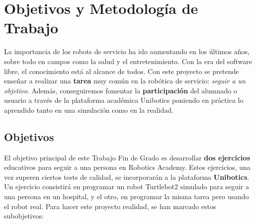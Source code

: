 \chapter{Objetivos y Metodología de Trabajo}
\label{cap:capitulo2}

La importancia de los robots de servicio ha ido aumentando en los últimos años, sobre todo en campos como la salud y el entretenimiento. Con la era del software libre, el conocimiento está al alcance de todos. Con este proyecto se pretende enseñar a realizar una \textbf{tarea} muy común en la robótica de servicio: \textit{seguir a un objetivo}. Además, conseguiremos fomentar la \textbf{participación} del alumnado o usuario a través de la plataforma académica Unibotics poniendo en práctica lo aprendido tanto en una simulación como en la realidad.




\section{Objetivos}
\label{sec:objetivos}
El objetivo principal de este Trabajo Fin de Grado es desarrollar \textbf{dos ejercicios} educativos para seguir a una persona en Robotics Academy. Estos ejercicios, una vez superen ciertos tests de calidad, se incorporarán a la plataforma \textbf{Unibotics}. Un ejercicio consistirá en programar un robot Turtlebot2 simulado para seguir a una persona en un hospital, y el otro, en programar la misma tarea pero usando el robot real. Para hacer este proyecto realidad, se han marcado estos subobjetivos:


